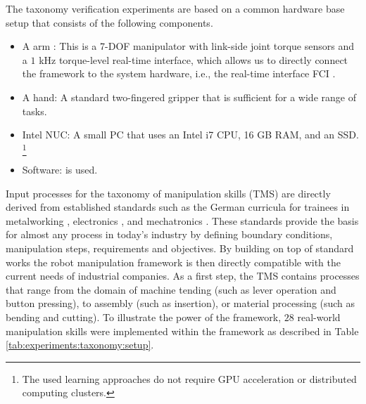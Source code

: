 The taxonomy verification experiments are based on a common hardware base setup that consists of the following components.
\begin{itemize}
\item A \platformname{} arm \cite{Haddadin.2022}: This is a 7-DOF manipulator with link-side joint torque sensors and a $1$ kHz torque-level real-time interface, which allows us to directly connect the \skillmodelabbr{} framework to the system hardware, i.e., the real-time interface FCI \cite{Haddadin.2022}.
\item A \platformname{} hand: A standard two-fingered gripper that is sufficient for a wide range of tasks.
\item Intel NUC: A small PC that uses an Intel i7 CPU, 16 GB RAM, and an SSD. \footnote{The used learning approaches do not require GPU acceleration or distributed computing clusters.}
\item Software: \softwareabbr{} is used.
\end{itemize}

Input processes for the taxonomy of manipulation skills (TMS) are directly derived from established standards such as the German curricula for trainees in metalworking \cite{Burmester.2020}, electronics \cite{Bumiller.2021}, and mechatronics \cite{Hebel.2020}.
These standards provide the basis for almost any process in today's industry by defining boundary conditions, manipulation steps, requirements and objectives.
By building on top of standard works the robot manipulation framework is then directly compatible with the current needs of industrial companies.
As a first step, the TMS contains processes that range from the domain of machine tending (such as lever operation and button pressing), to assembly (such as insertion), or material processing (such as bending and cutting).
To illustrate the power of the framework, $28$ real-world manipulation skills were implemented within the \skillmodelabbr{} framework as described in Table \ref{tab:experiments:taxonomy:setup}. 

